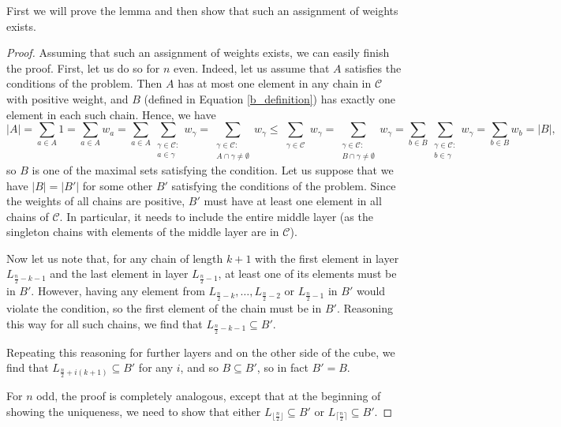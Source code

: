 \documentclass[11pt, reqno]{amsart}
\numberwithin{equation}{section}
\begin{document}
First we will prove the lemma and then show that such an assignment of weights exists.

\begin{proof}
        Assuming that such an assignment of weights exists, we can easily finish the proof. First, let us do so for $n$ even. Indeed, let us assume that $A$ satisfies the conditions of the problem. Then $A$ has at most one element in any chain in $\mathcal{C}$ with positive weight, and $B$ (defined in Equation \ref{b_definition}) has exactly one element in each such chain. Hence, we have
    \begin{equation}
        |A| = \sum_{a \in A} 1 = \sum_{a \in A} w_a = \sum_{a \in A} \sum_{\substack{\gamma \in \mathcal{C}: \\ a \in \gamma}} w_{\gamma} = \sum_{\substack{\gamma \in \mathcal{C}: \\ A \cap \gamma \neq \emptyset}} w_{\gamma} \leqslant \sum_{\substack{\gamma \in \mathcal{C}}} w_{\gamma} = \sum_{\substack{\gamma \in \mathcal{C}: \\ B \cap \gamma \neq \emptyset}} w_{\gamma} = \sum_{b \in B} \sum_{\substack{\gamma \in \mathcal{C}: \\ b \in \gamma}} w_{\gamma} = \sum_{b \in B} w_b = |B|,
    \end{equation}
    so $B$ is one of the maximal sets satisfying the condition. Let us suppose that we have $|B|=|B'|$ for some other $B'$ satisfying the conditions of the problem. Since the weights of all chains are positive, $B'$ must have at least one element in all chains of $\mathcal{C}$. In particular, it needs to include the entire middle layer (as the singleton chains with elements of the middle layer are in $\mathcal{C}$).
    
    Now let us note that, for any chain of length $k+1$ with the first element in layer $L_{\frac{n}{2}-k-1}$ and the last element in layer $L_{\frac{n}{2}-1}$, at least one of its elements must be in $B'$. However, having any element from $L_{\frac{n}{2}-k}, \dots, L_{\frac{n}{2}-2}$ or $L_{\frac{n}{2}-1}$ in $B'$ would violate the condition, so the first element of the chain must be in $B'$. Reasoning this way for all such chains, we find that $L_{\frac{n}{2}-k-1} \subseteq B'$.
    
    Repeating this reasoning for further layers and on the other side of the cube, we find that $L_{\frac{n}{2}+i(k+1)} \subseteq B'$ for any $i$, and so $B \subseteq B'$, so in fact $B'=B$.
    
    For $n$ odd, the proof is completely analogous, except that at the beginning of showing the uniqueness, we need to show that either $L_{\lfloor \frac{n}{2} \rfloor} \subseteq B'$ or $L_{\lceil \frac{n}{2} \rceil} \subseteq B'$.
    

\end{proof}
\end{document}
